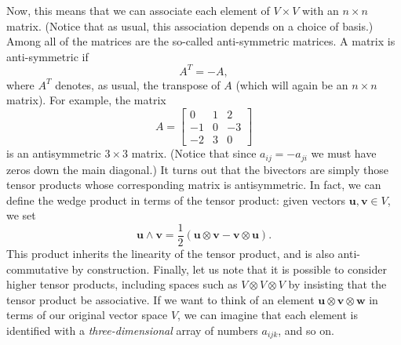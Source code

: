 \documentclass[letterpaper,12pt]{article}
\newcommand{\uu}{\mathbf{u}}
\newcommand{\vv}{\mathbf{v}}
\begin{document}
Now, this means that we can associate each element of $V\times V$ with an $n\times n$ matrix. (Notice that as usual, this association depends on a choice of basis.) Among all of the matrices are the so-called anti-symmetric matrices. A matrix is anti-symmetric if
\[
A^T = -A,
\]
where $A^T$ denotes, as usual, the transpose of $A$ (which will again be an $n\times n$ matrix). For example, the matrix
\[
A = \begin{bmatrix}
0 & 1 & 2\\
-1 & 0 & -3\\
-2 & 3 & 0
\end{bmatrix}
\]
is an antisymmetric $3\times 3$ matrix. (Notice that since $a_{ij} = -a_{ji}$ we must have zeros down the main diagonal.) It turns out that the bivectors are simply those tensor products whose corresponding matrix is antisymmetric. In fact, we can define the wedge product in terms of the tensor product: given vectors $\uu,\vv\in V$, we set
\[
\uu\wedge\vv = \frac{1}{2}\left(\uu\otimes \vv -\vv\otimes\uu\right).
\]
This product inherits the linearity of the tensor product, and is also anti-commutative by construction. Finally, let us note that it is possible to consider higher tensor products, including spaces such as $V\otimes V\otimes V$ by insisting that the tensor product be associative. If we want to think of an element $\uu\otimes\vv\otimes\mathbf{w}$ in terms of our original vector space $V$, we can imagine that each element is identified with a {\em three-dimensional} array of numbers $a_{ijk}$, and so on.
\end{document}
